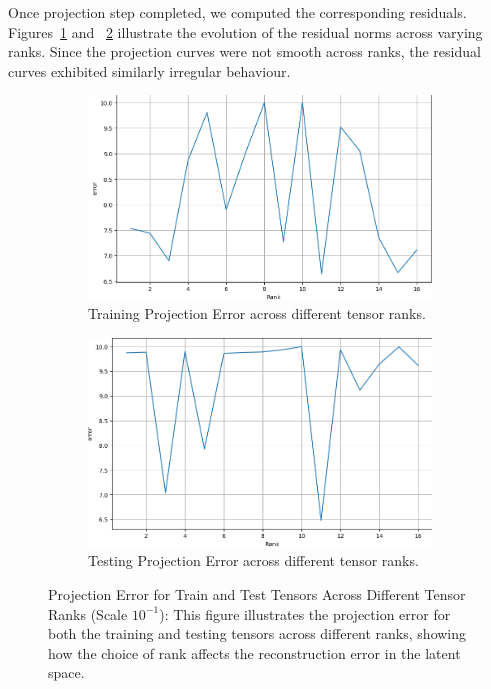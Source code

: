 \documentclass[pdflatex,sn-mathphys-num]{sn-jnl}
\theoremstyle{thmstyleone}
\theoremstyle{thmstyletwo}
\theoremstyle{thmstylethree}
\begin{document}
\noindent Once projection step completed, we computed the corresponding residuals. Figures~\ref{fig:train-residuals} and ~\ref{fig:test-residuals} illustrate the evolution of the residual norms across varying ranks. Since the projection curves were not smooth across ranks, the residual curves exhibited similarly irregular behaviour.
\begin{figure}[H]
    \centering
    \begin{subfigure}[t]{0.48\linewidth}
        \centering
        \includegraphics[width=\linewidth]{train errors.png}
        \caption{ Training Projection Error across different tensor ranks.}
        \label{fig:train-residuals}
    \end{subfigure}
    \hfill
    \begin{subfigure}[t]{0.48\linewidth}
        \centering
        \includegraphics[width=\linewidth]{test error.png}
        \caption{Testing Projection Error across different tensor ranks.}
        \label{fig:test-residuals}
    \end{subfigure}
    \caption{Projection Error for Train and Test Tensors Across Different Tensor Ranks (Scale $10^{-1}$): This figure illustrates the projection error for both the training and testing tensors across different ranks, showing how the choice of rank affects the reconstruction error in the latent space.}
    \label{fig:train-test-residual}
\end{figure}
 
\end{document}
